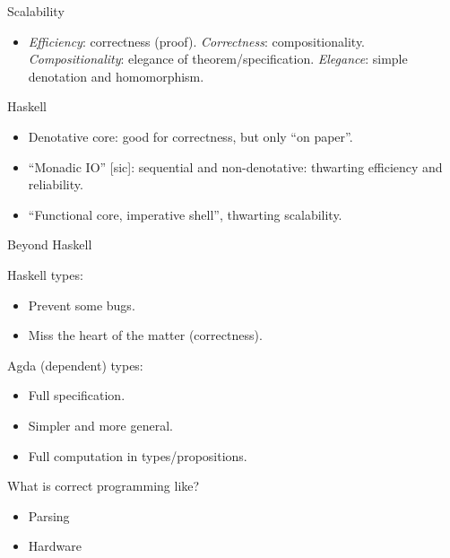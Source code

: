 \documentclass[aspectratio=169,handout]{beamer}
\begin{document}
\nc\pitem{\pause\item}

\begin{frame}{Scalability}
\begin{itemize}\itemsep3ex
\item \emph{Efficiency}: correctness (proof).
\pitem \emph{Correctness}: compositionality.
\pitem \emph{Compositionality}: elegance of theorem/specification.
\pitem \emph{Elegance}: simple denotation and homomorphism.
\end{itemize}
\end{frame}

\begin{frame}{Haskell}
\begin{itemize}\itemsep3ex
\item Denotative core: good for correctness, but only ``on paper''.
\item ``Monadic IO'' [sic]: sequential and non-denotative: thwarting efficiency and reliability.
\item ``Functional core, imperative shell'', thwarting scalability.
\end{itemize}
\end{frame}

\begin{frame}{Beyond Haskell}

Haskell types:
\begin{itemize}\itemsep3ex
\item Prevent some bugs.
\item Miss the heart of the matter (correctness).
\end{itemize}

\pause
\vspace{4ex}

Agda (dependent) types:
\begin{itemize}\itemsep3ex
\item Full specification.
\item Simpler and more general.
\item Full computation in types/propositions.
\end{itemize}
\end{frame}

\begin{frame}{What is correct programming like?}

\begin{itemize}\itemsep3ex
\item Parsing
\item Hardware
\end{itemize}


\end{frame}
\end{document}
